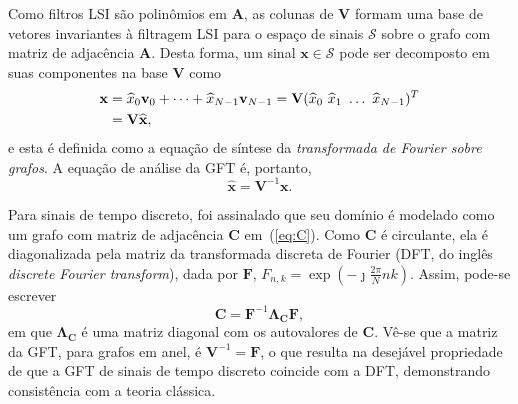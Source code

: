 Como filtros LSI s\~ao polin\^omios em $ \mathbf{A} $, as colunas de $ \mathbf{V} $ formam uma base de vetores invariantes \`a  filtragem LSI
para o espa\c{c}o de sinais $ \mathcal{S} $ sobre o grafo com matriz de adjac\^encia $ \mathbf{A} $. Desta forma, um sinal $ \mathbf{x} \in \mathcal{S} $ pode ser decomposto em suas componentes na base $ \mathbf{V} $ como
\begin{align}\label{eq:GFT_inv}
\mathbf{x} &= \widehat{x}_0 \mathbf{v}_0 + \dots + \widehat{x}_{N-1} \mathbf{v}_{N-1} = \mathbf{V} (\widehat{x}_0 \ \widehat{x}_1 \ \dots \ \widehat{x}_{N-1})^T \notag \\
&= \mathbf{V} \widehat{\mathbf{x}},
\end{align}
e esta \'e definida como a equa\c{c}\~ao de s\'intese da \emph{transformada de Fourier sobre grafos}. A equa\c{c}\~ao de an\'alise da GFT \'e, portanto,
\begin{equation}\label{eq:GFT_fwd}
\widehat{\mathbf{x}} = \mathbf{V}^{-1} \mathbf{x}.
\end{equation}

Para sinais de tempo discreto, foi assinalado que seu dom\'inio \'e modelado como um grafo com matriz de adjac\^encia $ \mathbf{C} $ em~(\ref{eq:C}). Como $ \mathbf{C} $ \'e circulante, ela \'e diagonalizada pela matriz da transformada discreta de Fourier (DFT, do ingl\^es \emph{discrete Fourier transform}), dada por $ \mathbf{F} $, $ F_{n,k} = \exp \left( -\jmath\frac{2 \pi}{N} nk \right) $. Assim, pode-se escrever%
\begin{equation}\label{eq:diag_C}
\mathbf{C} = \mathbf{F}^{-1} \mathbf{\Lambda}_{\mathbf{C}} \mathbf{F},
\end{equation}
em que $\mathbf{\Lambda}_{\mathbf{C}}$ \'e uma matriz diagonal com os autovalores de $\mathbf{C}$. V\^e-se que a matriz da GFT, para grafos em anel, \'e $ \mathbf{V}^{-1} = \mathbf{F} $, o que resulta na desej\'avel propriedade de que a GFT de sinais de tempo discreto coincide com a  DFT, demonstrando consist\^encia com a teoria cl\'assica.

